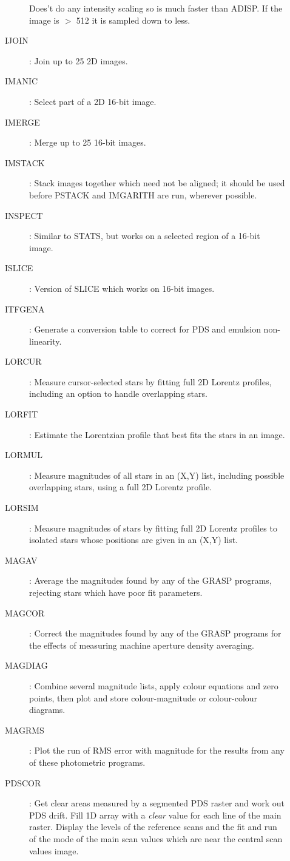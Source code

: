 \begin{description}
\begin{description}
Does't do any intensity scaling so is much faster than ADISP.
If the image is $>$ 512 it is sampled down to less.
\item [IJOIN]: Join up to 25 2D images.
\item [IMANIC]: Select part of a 2D 16-bit image.
\item [IMERGE]: Merge up to 25 16-bit images.
\item [IMSTACK]: Stack images together which need not be aligned; it should be
used before PSTACK and IMGARITH are run, wherever possible.
\item [INSPECT]: Similar to STATS, but works on a selected region of a 16-bit
image.
\item [ISLICE]: Version of SLICE which works on 16-bit images.
\item [ITFGENA]: Generate a conversion table to correct for PDS and emulsion
non-linearity.
\item [LORCUR]: Measure cursor-selected stars by fitting full 2D Lorentz
profiles, including an option to handle overlapping stars.
\item [LORFIT]: Estimate the Lorentzian profile that best fits the stars in an
image.
\item [LORMUL]: Measure magnitudes of all stars in an (X,Y) list, including
possible overlapping stars, using a full 2D Lorentz profile.
\item [LORSIM]: Measure magnitudes of stars by fitting full 2D Lorentz profiles
to isolated stars whose positions are given in an (X,Y) list.
\item [MAGAV]: Average the magnitudes found by any of the GRASP programs,
rejecting stars which have poor fit parameters.
\item [MAGCOR]: Correct the magnitudes found by any of the GRASP programs for
the effects of measuring machine aperture density averaging.
\item [MAGDIAG]: Combine several magnitude lists, apply colour equations and
zero points, then plot and store colour-magnitude or colour-colour diagrams.
\item [MAGRMS]: Plot the run of RMS error with magnitude for the results from
any of these photometric programs.
\item [PDSCOR]: Get clear areas measured by a segmented PDS raster and work
out PDS drift.
Fill 1D array with a {\em clear} value for each line of the main raster.
Display the levels of the reference scans and the fit and run of the mode of
the main scan values which are near the central scan values image.

\end{description}
\end{description}
